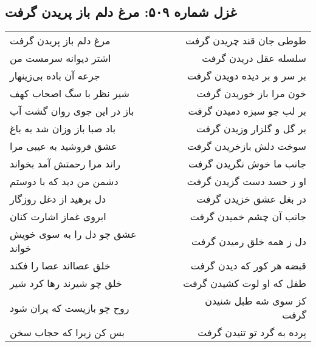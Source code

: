 \begin{center}
\section*{غزل شماره ۵۰۹: مرغ دلم باز پریدن گرفت}
\label{sec:0509}
\begin{longtable}{l p{0.5cm} r}
مرغ دلم باز پریدن گرفت
&&
طوطی جان قند چریدن گرفت
\\
اشتر دیوانه سرمست من
&&
سلسله عقل دریدن گرفت
\\
جرعه آن باده بی‌زینهار
&&
بر سر و بر دیده دویدن گرفت
\\
شیر نظر با سگ اصحاب کهف
&&
خون مرا باز خوریدن گرفت
\\
باز در این جوی روان گشت آب
&&
بر لب جو سبزه دمیدن گرفت
\\
باد صبا باز وزان شد به باغ
&&
بر گل و گلزار وزیدن گرفت
\\
عشق فروشید به عیبی مرا
&&
سوخت دلش بازخریدن گرفت
\\
راند مرا رحمتش آمد بخواند
&&
جانب ما خوش نگریدن گرفت
\\
دشمن من دید که با دوستم
&&
او ز حسد دست گزیدن گرفت
\\
دل برهید از دغل روزگار
&&
در بغل عشق خزیدن گرفت
\\
ابروی غماز اشارت کنان
&&
جانب آن چشم خمیدن گرفت
\\
عشق چو دل را به سوی خویش خواند
&&
دل ز همه خلق رمیدن گرفت
\\
خلق عصااند عصا را فکند
&&
قبضه هر کور که دیدن گرفت
\\
خلق چو شیرند رها کرد شیر
&&
طفل که او لوت کشیدن گرفت
\\
روح چو بازیست که پران شود
&&
کز سوی شه طبل شنیدن گرفت
\\
بس کن زیرا که حجاب سخن
&&
پرده به گرد تو تنیدن گرفت
\\
\end{longtable}
\end{center}
